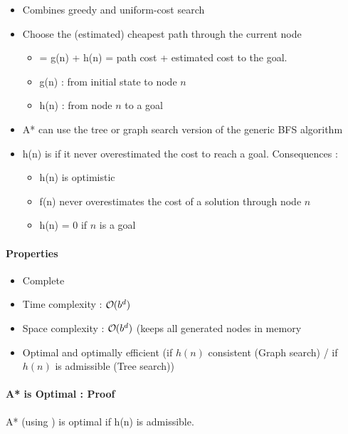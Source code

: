 \begin{itemize}
\item Combines greedy and uniform-cost search
\item Choose the (estimated) cheapest path through the current node
	\begin{itemize}
	\item {} = g(n) + h(n) = path cost + estimated cost to the goal.
	\item g(n) :  from initial state to node $n$
	\item h(n) :  from node $n$ to a goal
	\end{itemize}
\item A* can use the tree or graph search version of the generic BFS algorithm
\item h(n) is  if it never overestimated the cost to reach a goal. Consequences :
	\begin{itemize}
	\item h(n) is optimistic
	\item f(n) never overestimates the cost of a solution through node $n$
	\item h(n) = 0 if $n$ is a goal
	\end{itemize}
\end{itemize}

\paragraph{Properties}
\begin{itemize}
\item Complete
\item Time complexity : $\bigO (b^d)$
\item Space complexity : $\bigO (b^d)$ (keeps all generated nodes in memory
\item Optimal and optimally efficient (if $h(n)$ consistent (Graph search) / if $h(n)$ is admissible (Tree search))
\end{itemize}

\paragraph{A* is Optimal : Proof}

A* (using ) is optimal if h(n) is admissible.

